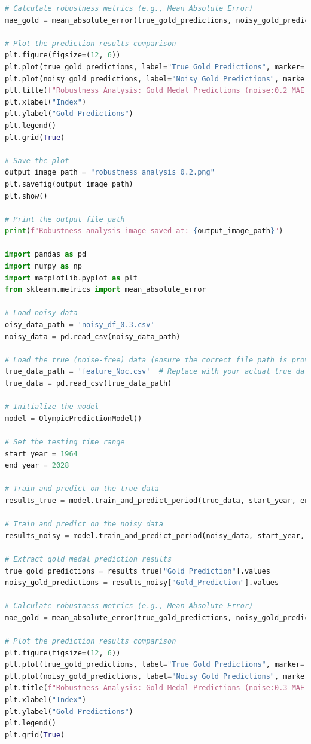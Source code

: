 \documentclass[12pt]{article}
\begin{document}
\begin{lstlisting}[language=Python, style=mystyle, caption=model.ipynb]
# Calculate robustness metrics (e.g., Mean Absolute Error)
mae_gold = mean_absolute_error(true_gold_predictions, noisy_gold_predictions)

# Plot the prediction results comparison
plt.figure(figsize=(12, 6))
plt.plot(true_gold_predictions, label="True Gold Predictions", marker="o")
plt.plot(noisy_gold_predictions, label="Noisy Gold Predictions", marker="x", linestyle="--")
plt.title(f"Robustness Analysis: Gold Medal Predictions (noise:0.2 MAE: {mae_gold:.2f})")
plt.xlabel("Index")
plt.ylabel("Gold Predictions")
plt.legend()
plt.grid(True)

# Save the plot
output_image_path = "robustness_analysis_0.2.png"
plt.savefig(output_image_path)
plt.show()

# Print the output file path
print(f"Robustness analysis image saved at: {output_image_path}")

import pandas as pd
import numpy as np
import matplotlib.pyplot as plt
from sklearn.metrics import mean_absolute_error

# Load noisy data
oisy_data_path = 'noisy_df_0.3.csv'
noisy_data = pd.read_csv(noisy_data_path)

# Load the true (noise-free) data (ensure the correct file path is provided)
true_data_path = 'feature_Noc.csv'  # Replace with your actual true data path
true_data = pd.read_csv(true_data_path)

# Initialize the model
model = OlympicPredictionModel()

# Set the testing time range
start_year = 1964
end_year = 2028

# Train and predict on the true data
results_true = model.train_and_predict_period(true_data, start_year, end_year)

# Train and predict on the noisy data
results_noisy = model.train_and_predict_period(noisy_data, start_year, end_year)

# Extract gold medal prediction results
true_gold_predictions = results_true["Gold_Prediction"].values
noisy_gold_predictions = results_noisy["Gold_Prediction"].values

# Calculate robustness metrics (e.g., Mean Absolute Error)
mae_gold = mean_absolute_error(true_gold_predictions, noisy_gold_predictions)

# Plot the prediction results comparison
plt.figure(figsize=(12, 6))
plt.plot(true_gold_predictions, label="True Gold Predictions", marker="o")
plt.plot(noisy_gold_predictions, label="Noisy Gold Predictions", marker="x", linestyle="--")
plt.title(f"Robustness Analysis: Gold Medal Predictions (noise:0.3 MAE: {mae_gold:.2f})")
plt.xlabel("Index")
plt.ylabel("Gold Predictions")
plt.legend()
plt.grid(True)


\end{lstlisting}
\end{document}
